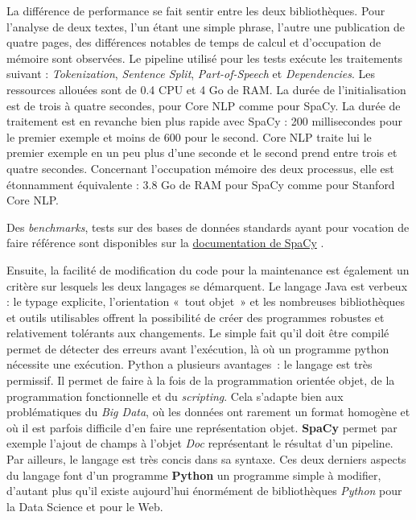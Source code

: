La différence de performance se fait sentir entre les deux bibliothèques. Pour l'analyse de deux textes, l'un étant une simple phrase, l'autre une publication de quatre pages, des différences notables de temps de calcul et d'occupation de mémoire sont observées. Le pipeline utilisé pour les tests exécute les traitements suivant : \textit{Tokenization}, \textit{Sentence Split}, \textit{Part-of-Speech} et \textit{Dependencies}. Les ressources allouées sont de 0.4 CPU et 4 Go de RAM. La durée de l'initialisation est de trois à quatre secondes, pour Core NLP comme pour SpaCy. La durée de traitement est en revanche bien plus rapide avec SpaCy : 200 millisecondes pour le premier exemple et moins de 600 pour le second. Core NLP traite lui le premier exemple en un peu plus d'une seconde et le second prend entre trois et quatre secondes. Concernant l'occupation mémoire des deux processus, elle est étonnamment équivalente : 3.8 Go de RAM pour SpaCy comme pour Stanford Core NLP.

Des \textit{benchmarks}, tests sur des bases de données standards ayant pour vocation de faire référence sont disponibles sur la  \href{https://spacy.io/usage/facts-figures}{documentation de SpaCy} \cite{spacy-figures}.
\newline

Ensuite, la facilité de modification du code pour la maintenance est également un critère sur lesquels les deux langages se démarquent. Le langage Java est verbeux : le typage explicite, l'orientation «~tout objet~» et les nombreuses bibliothèques et outils utilisables offrent la possibilité de créer des programmes robustes et relativement tolérants aux changements. Le simple fait qu'il doit être compilé permet de détecter des erreurs avant l'exécution, là où un programme python nécessite une exécution. Python a plusieurs avantages~: le langage est très permissif. Il permet de faire à la fois de la programmation orientée objet, de la programmation fonctionnelle et du \textit{scripting}. Cela s'adapte bien aux problématiques du \textit{Big Data}, où les données ont rarement un format homogène et où il est parfois difficile d'en faire une représentation objet. \textbf{SpaCy} permet par exemple l'ajout de champs à l'objet \textit{Doc} représentant le résultat d'un pipeline. Par ailleurs, le langage est très concis dans sa syntaxe. Ces deux derniers aspects du langage font d'un programme \textbf{Python} un programme simple à modifier, d'autant plus qu'il existe aujourd'hui énormément de bibliothèques \textit{Python} pour la Data Science et pour le Web.
\newline

